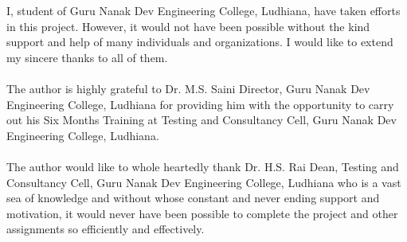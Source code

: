 \begin{Huge}
\end{Huge}
I, student of Guru Nanak Dev Engineering College, Ludhiana, have taken efforts in this project. However, it would not have been possible without the kind support and help of many individuals and organizations. I would like to extend my sincere thanks to all of them.\\\\
The author is highly grateful to Dr. M.S. Saini Director, Guru Nanak Dev Engineering College, Ludhiana for providing him with the opportunity to carry out his Six Months Training at Testing and Consultancy Cell, Guru Nanak Dev Engineering College, Ludhiana.\\\\
The author would like to whole heartedly thank Dr. H.S. Rai Dean, Testing and Consultancy Cell, Guru Nanak Dev Engineering College, Ludhiana who is a vast sea of knowledge and without whose constant and never ending support and motivation, it would never have been possible to complete the project and other assignments so efficiently and effectively.\\\\

